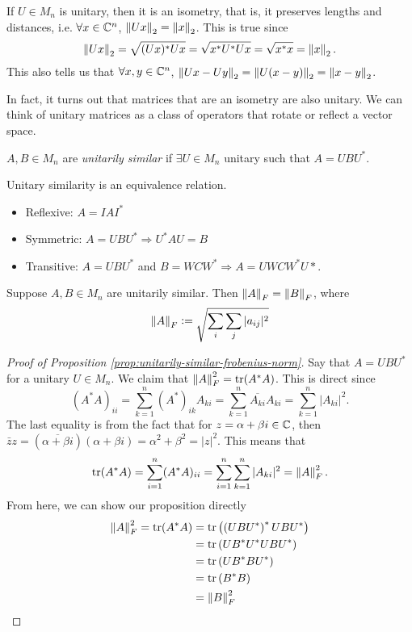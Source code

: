\begin{note*}
If $U \in M_n$ is unitary, then it is an isometry, that is, it preserves lengths and distances, i.e. $\forall x \in \mathbb C^n$, $\left\lVert Ux\right\rVert_2 = \left\lVert x\right\rVert_2$. This is true since
$$
\left\lVert Ux\right\rVert_2 = \sqrt{(Ux)^* Ux} = \sqrt{x^*U^*Ux} = \sqrt{x^*x} = \left\lVert x\right\rVert_2.
$$
This also tells us that $\forall x, y \in \mathbb C^n$, $\left\lVert Ux-Uy\right\rVert_2 = \left\lVert U(x-y)\right\rVert_2 = \left\lVert x-y\right\rVert_2$. 
\end{note*}

\noindent In fact, it turns out that matrices that are an isometry are also unitary. We can think of unitary matrices as a class of operators that rotate or reflect a vector space.

\begin{definition}
\label{def:unitarily-similar}
$A, B \in M_n$ are \textit{unitarily similar} if $\exists U \in M_n$ unitary such that $A = UBU^*$.
\end{definition}

\begin{note*}
Unitary similarity is an equivalence relation.
\begin{itemize}
    \item Reflexive: $A = IAI^*$
    \item Symmetric: $A = UBU^* \Longrightarrow U^*AU = B$
    \item Transitive: $A = UBU^*$ and $B = WCW^* \Longrightarrow A = UWCW^*U*$. 
\end{itemize}
\end{note*}

\begin{proposition}
\label{prop:unitarily-similar-frobenius-norm}
Suppose $A,B \in M_n$ are unitarily similar. Then $\left\lVert A\right\rVert_F = \left\lVert B\right\rVert_F$, where
$$
\left\lVert A\right\rVert_F \vcentcolon= \sqrt{\sum_{i}\sum_{j}|a_{ij}|^2}
$$
\end{proposition}

\begin{proof}[Proof of Proposition \ref{prop:unitarily-similar-frobenius-norm}]
Say that $A = UBU^*$ for a unitary $U \in M_n$. We claim that $\left\lVert A\right\rVert_F^2 = \operatorname{tr}(A^*A)$. This is direct since 
$$(A^*A)_{ii} = \sum_{k=1}^n (A^*)_{ik}A_{ki} = \sum_{k=1}^n \overline{A_{ki}}A_{ki} = \sum_{k=1}^n |A_{ki}|^2.$$ 
The last equality is from the fact that for $z = \alpha+\beta i \in \mathbb C$, then $\bar{z}z = (\overline{\alpha + \beta i})(\alpha + \beta i) = \alpha^2 + \beta^2 = |z|^2$. This means that 
$$\operatorname{tr}(A^*A) = \sum_{i=1}^n (A^*A)_{ii} = \sum_{i=1}^n \sum_{k=1}^n |A_{ki}|^2 = \left\lVert A\right\rVert_F^2.$$
From here, we can show our proposition directly
\begin{align*}
    \left\lVert A\right\rVert_F^2 = \operatorname{tr}(A^*A) &= \operatorname{tr}\left(\left(UBU^*\right)^*UBU^*\right) \\
                             &= \operatorname{tr}\left(UB^*U^*UBU^*\right) \\
                             &= \operatorname{tr}\left(UB^*BU^*\right) \\
                             &= \operatorname{tr}\left(B^*B\right) \\
                             &= \left\lVert B\right\rVert_F^2
\end{align*}
\end{proof}

